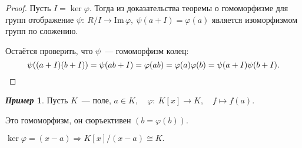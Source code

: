 \documentclass[a4paper, 14pt]{extarticle}
\newcommand{\n}{\par}
\newcommand{\im}{\mathrm{Im} \,}
\renewcommand{\phi}{\varphi}
\theoremstyle{definition}
\newtheorem*{exmpl*}{\textit{Пример}}
\theoremstyle{plain}
\numberwithin{theorem}{section}
\numberwithin{definition}{section}
\numberwithin{statement}{section}
\numberwithin{lemma}{section}
\numberwithin{consequence}{section}
\begin{document}
		\begin{proof}
			Пусть ${I = \ker \phi.}$ Тогда из доказательства теоремы о гомоморфизме для групп отображение ${\psi{:} \ R/I \rightarrow \im \phi, \ \psi(a + I) = \phi(a)}$ является изоморфизмом групп по сложению.\n
			Остаётся проверить, что $\psi$~--- гомоморфизм колец:
			\begin{equation*}
				\psi((a + I)(b + I)) = \psi(ab + I) = \phi(ab) = \phi(a)\phi(b) = \psi(a + I)\psi(b + I). \qedhere
			\end{equation*}
		\end{proof}
		\begin{exmpl*}
			Пусть $K$~--- поле, ${a \in K, \quad \phi{:} \ K[x] \rightarrow K, \quad f \mapsto f(a).}$ \n
			Это гомоморфизм, он сюръективен ${(b = \phi(b)).}$ \n
			$\ker \phi = (x - a) \Longrightarrow K[x]/(x - a) \cong K.$
		\end{exmpl*}
\end{document}
